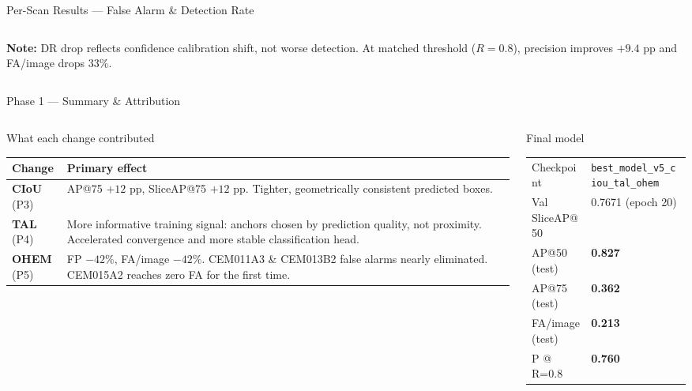 \documentclass[aspectratio=169, 10pt]{beamer}
\begin{document}
\begin{frame}{Per-Scan Results — False Alarm \& Detection Rate}
\begin{columns}[T]
\begin{column}{0.46\textwidth}
      \vspace{4pt}
      {\scriptsize
        \textbf{Note:} DR drop reflects confidence calibration shift, not worse detection.
        At matched threshold ($R{=}0.8$), precision improves $+9.4$ pp and FA/image drops 33\%.
      }
    \end{column}
  \end{columns}
\end{frame}

\begin{frame}{Phase 1 — Summary \& Attribution}
  \begin{columns}[T]
    \begin{column}{0.52\textwidth}
      \begin{block}{\small What each change contributed}
        \small
        \begin{tabular}{lp{5.4cm}}
          \toprule
          Change & Primary effect \\
          \midrule
          \textbf{CIoU} (P3) &
            AP@75 $+12$ pp, SliceAP@75 $+12$ pp.
            Tighter, geometrically consistent predicted boxes.\\[3pt]
          \textbf{TAL} (P4) &
            More informative training signal: anchors chosen by prediction quality,
            not proximity. Accelerated convergence and more stable classification head.\\[3pt]
          \textbf{OHEM} (P5) &
            FP $-42\%$, FA/image $-42\%$.
            CEM011A3 \& CEM013B2 false alarms nearly eliminated.
            CEM015A2 reaches zero FA for the first time.\\
          \bottomrule
        \end{tabular}
      \end{block}
    \end{column}
    \begin{column}{0.44\textwidth}
      \vspace{4pt}
      \begin{block}{\small Final model}
        \scriptsize
        \begin{tabular}{ll}
          \toprule
          Checkpoint & \texttt{best\_model\_v5\_ciou\_tal\_ohem} \\
          Val SliceAP@50 & 0.7671 (epoch 20) \\
          AP@50 (test) & \textbf{0.827} \\
          AP@75 (test) & \textbf{0.362} \\
          FA/image (test) & \textbf{0.213} \\
          P @ R=0.8 & \textbf{0.760} \\
          \bottomrule
        \end{tabular}
      \end{block}


\end{column}
\end{columns}
\end{frame}
\end{document}
